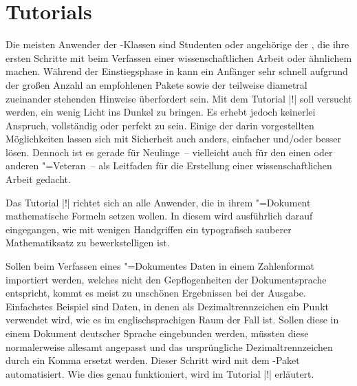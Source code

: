 \chapter{Tutorials}
%
%
Die meisten Anwender der \TUDScript-Klassen sind Studenten oder angehörige der 
\TnUD, die ihre ersten Schritte mit  beim Verfassen einer 
wissenschaftlichen Arbeit oder ähnlichem machen. Während der Einstiegsphase in 
 kann ein Anfänger sehr schnell aufgrund der großen Anzahl an 
empfohlenen Pakete sowie der teilweise diametral zueinander stehenden Hinweise 
überfordert sein. Mit dem Tutorial |!| soll versucht werden, 
ein wenig Licht ins Dunkel zu bringen. Es erhebt jedoch keinerlei Anspruch, 
vollständig oder perfekt zu sein. Einige der darin vorgestellten Möglichkeiten 
lassen sich mit Sicherheit auch anders, einfacher und/oder besser lösen. 
Dennoch ist es gerade für Neulinge~-- vielleicht auch für den einen oder 
anderen "=Veteran~-- als Leitfaden für die Erstellung einer 
wissenschaftlichen Arbeit gedacht.

%
%
Das Tutorial |!| richtet sich an alle Anwender, die in ihrem 
"=Dokument mathematische Formeln setzen wollen. In diesem wird 
ausführlich darauf eingegangen, wie mit wenigen Handgriffen ein typografisch 
sauberer Mathematiksatz zu bewerkstelligen ist.

%
%
%
Sollen beim Verfassen eines "=Dokumentes Daten in einem 
Zahlenformat importiert werden, welches nicht den Gepflogenheiten der 
Dokumentsprache entspricht, kommt es meist zu unschönen Ergebnissen bei der 
Ausgabe. Einfachstes Beispiel sind Daten, in denen als Dezimaltrennzeichen ein 
Punkt verwendet wird, wie es im englischsprachigen Raum der Fall ist. Sollen 
diese in einem Dokument deutscher Sprache eingebunden werden, müssten diese 
normalerweise allesamt angepasst und das ursprüngliche Dezimaltrennzeichen 
durch ein Komma ersetzt werden. Dieser Schritt wird mit dem \TUDScript-Paket 
 automatisiert. Wie dies genau funktioniert, wird im Tutorial 
|!| erläutert.
%
